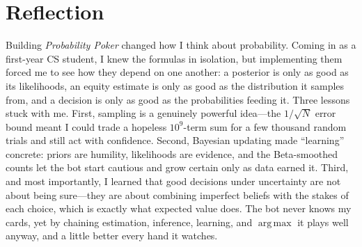 \documentclass[11pt]{article}
\DeclareMathOperator*{\argmax}{arg\,max}
\begin{document}
\section*{Reflection}

Building \emph{Probability Poker} changed how I think about probability. Coming in
as a first-year CS student, I knew the formulas in isolation, but implementing
them forced me to see how they depend on one another: a posterior is only as good
as its likelihoods, an equity estimate is only as good as the distribution it
samples from, and a decision is only as good as the probabilities feeding it.
Three lessons stuck with me. First, sampling is a genuinely powerful idea---the
$1/\sqrt N$ error bound meant I could trade a hopeless $10^9$-term sum for a few
thousand random trials and still act with confidence. Second, Bayesian updating
made ``learning'' concrete: priors are humility, likelihoods are evidence, and the
Beta-smoothed counts let the bot start cautious and grow certain only as data
earned it. Third, and most importantly, I learned that good decisions under
uncertainty are not about being sure---they are about combining imperfect beliefs
with the stakes of each choice, which is exactly what expected value does. The bot
never knows my cards, yet by chaining estimation, inference, learning, and
$\argmax$ it plays well anyway, and a little better every hand it watches.
\end{document}
